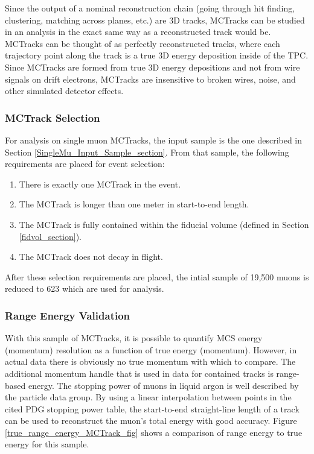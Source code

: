 Since the output of a nominal reconstruction chain (going through hit finding, clustering, matching across planes, etc.) are 3D tracks, {\sc MCTracks} can be studied in an analysis in the exact same way as a reconstructed track would be. {\sc MCTracks} can be thought of as perfectly reconstructed tracks, where each trajectory point along the track is a true 3D energy deposition inside of the {\ub} TPC.\\

Since {\sc MCTracks} are formed from true 3D energy depositions and not from wire signals on drift electrons, {\sc MCTracks} are insensitive to broken wires, noise, and other simulated detector effects.

\subsubsection{MCTrack Selection}\label{MCTrack_Selection_section}
For analysis on single muon {\sc MCTracks}, the input sample is the one described in Section \ref{SingleMu_Input_Sample_section}. From that sample, the following requirements are placed for event selection:
\begin{enumerate}
	\item There is exactly one {\sc MCTrack} in the event.
	\item The {\sc MCTrack} is longer than one meter in start-to-end length.
	\item The {\sc MCTrack} is fully contained within the fiducial volume (defined in Section \ref{fidvol_section}).
	\item The {\sc MCTrack} does not decay in flight.
\end{enumerate}
After these selection requirements are placed, the intial sample of 19,500 muons is reduced to 623 which are used for analysis.

\subsubsection{Range Energy Validation}\label{Range_Energy_Validation_section}
With this sample of {\sc MCTracks}, it is possible to quantify MCS energy (momentum) resolution as a function of true energy (momentum). However, in actual {\ub} data there is obviously no true momentum with which to compare. The additional momentum handle that is used in data for contained tracks is range-based energy. The stopping power of muons in liquid argon is well described by the particle data group\cite{PDG_spline_table}. By using a linear interpolation between points in the cited PDG stopping power table, the start-to-end straight-line length of a track can be used to reconstruct the muon's total energy with good accuracy. Figure \ref{true_range_energy_MCTrack_fig} shows a comparison of range energy to true energy for this sample. \\

